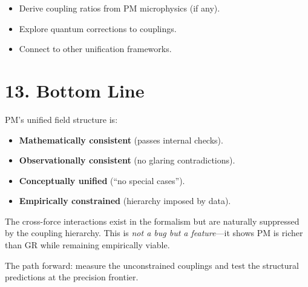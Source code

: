 \documentclass{article}
\begin{document}
\begin{itemize}
    \item Derive coupling ratios from PM microphysics (if any).
    \item Explore quantum corrections to couplings.
    \item Connect to other unification frameworks.
\end{itemize}

\section*{13. Bottom Line}

PM's unified field structure is:

\begin{itemize}
    \item \textbf{Mathematically consistent} (passes internal checks).
    \item \textbf{Observationally consistent} (no glaring contradictions).
    \item \textbf{Conceptually unified} (``no special cases'').
    \item \textbf{Empirically constrained} (hierarchy imposed by data).
\end{itemize}

The cross-force interactions exist in the formalism but are naturally suppressed
by the coupling hierarchy. This is \emph{not a bug but a feature}—it shows PM is
richer than GR while remaining empirically viable.

The path forward: measure the unconstrained couplings and test the structural
predictions at the precision frontier.
\end{document}
